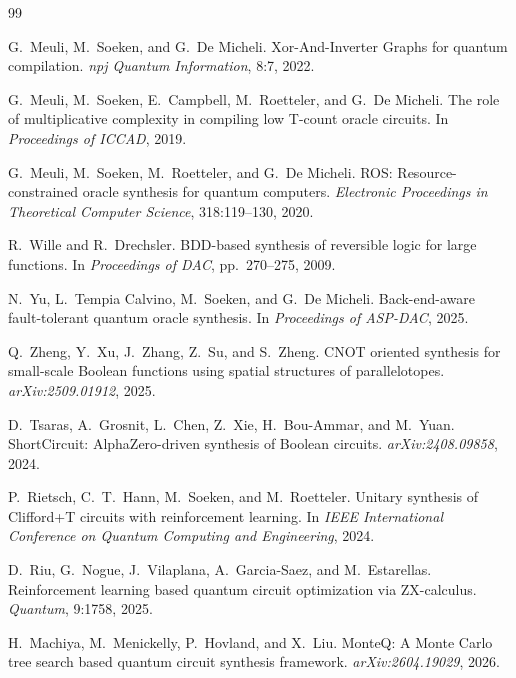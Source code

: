 \documentclass[UTF8,fontset=macnew,11pt]{ctexart}
\begin{document}
\begingroup
\footnotesize
\begin{thebibliography}{99}

G.~Meuli, M.~Soeken, and G.~De Micheli.
\newblock Xor-And-Inverter Graphs for quantum compilation.
\newblock \emph{npj Quantum Information}, 8:7, 2022.

G.~Meuli, M.~Soeken, E.~Campbell, M.~Roetteler, and G.~De Micheli.
\newblock The role of multiplicative complexity in compiling low T-count oracle circuits.
\newblock In \emph{Proceedings of ICCAD}, 2019.

G.~Meuli, M.~Soeken, M.~Roetteler, and G.~De Micheli.
\newblock ROS: Resource-constrained oracle synthesis for quantum computers.
\newblock \emph{Electronic Proceedings in Theoretical Computer Science}, 318:119--130, 2020.

R.~Wille and R.~Drechsler.
\newblock BDD-based synthesis of reversible logic for large functions.
\newblock In \emph{Proceedings of DAC}, pp.~270--275, 2009.

N.~Yu, L.~Tempia Calvino, M.~Soeken, and G.~De Micheli.
\newblock Back-end-aware fault-tolerant quantum oracle synthesis.
\newblock In \emph{Proceedings of ASP-DAC}, 2025.

Q.~Zheng, Y.~Xu, J.~Zhang, Z.~Su, and S.~Zheng.
\newblock CNOT oriented synthesis for small-scale Boolean functions using spatial structures of parallelotopes.
\newblock \emph{arXiv:2509.01912}, 2025.

D.~Tsaras, A.~Grosnit, L.~Chen, Z.~Xie, H.~Bou-Ammar, and M.~Yuan.
\newblock ShortCircuit: AlphaZero-driven synthesis of Boolean circuits.
\newblock \emph{arXiv:2408.09858}, 2024.

P.~Rietsch, C.~T.~Hann, M.~Soeken, and M.~Roetteler.
\newblock Unitary synthesis of Clifford+T circuits with reinforcement learning.
\newblock In \emph{IEEE International Conference on Quantum Computing and Engineering}, 2024.

D.~Riu, G.~Nogue, J.~Vilaplana, A.~Garcia-Saez, and M.~Estarellas.
\newblock Reinforcement learning based quantum circuit optimization via ZX-calculus.
\newblock \emph{Quantum}, 9:1758, 2025.

H.~Machiya, M.~Menickelly, P.~Hovland, and X.~Liu.
\newblock MonteQ: A Monte Carlo tree search based quantum circuit synthesis framework.
\newblock \emph{arXiv:2604.19029}, 2026.

\end{thebibliography}
\endgroup
\end{document}

